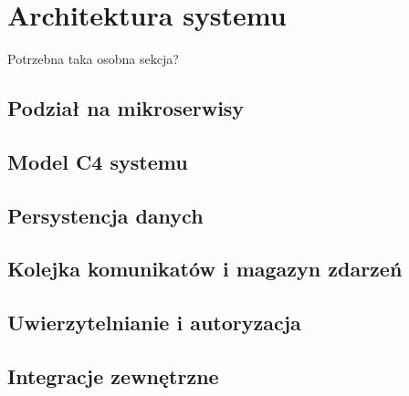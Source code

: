 \clearpage %

\section{Architektura systemu}

Potrzebna taka osobna sekcja?

\subsection{Podział na mikroserwisy}

\subsection{Model C4 systemu}

\subsection{Persystencja danych}

\subsection{Kolejka komunikatów i magazyn zdarzeń}

\subsection{Uwierzytelnianie i autoryzacja}

\subsection{Integracje zewnętrzne}